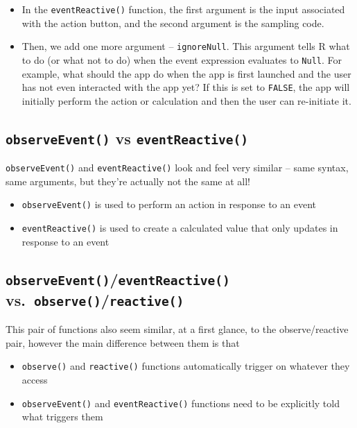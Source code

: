 \documentclass[
  letterpaper,
  DIV=11,
  numbers=noendperiod]{scrreprt}
\providecommand{\tightlist}{%
  \setlength{\itemsep}{0pt}\setlength{\parskip}{0pt}}
\begin{document}
\begin{itemize}
\tightlist
\item
  In the \texttt{eventReactive()} function, the first argument is the
  input associated with the action button, and the second argument is
  the sampling code.
\item
  Then, we add one more argument -- \texttt{ignoreNull}. This argument
  tells R what to do (or what not to do) when the event expression
  evaluates to \texttt{Null}. For example, what should the app do when
  the app is first launched and the user has not even interacted with
  the app yet? If this is set to \texttt{FALSE}, the app will initially
  perform the action or calculation and then the user can re-initiate
  it.
\end{itemize}

\hypertarget{observeevent-vs-eventreactive}{%
\subsection{\texorpdfstring{\texttt{observeEvent()} vs
\texttt{eventReactive()}}{observeEvent() vs eventReactive()}}\label{observeevent-vs-eventreactive}}

\texttt{observeEvent()} and \texttt{eventReactive()} look and feel very
similar -- same syntax, same arguments, but they're actually not the
same at all!

\begin{itemize}
\tightlist
\item
  \texttt{observeEvent()} is used to perform an action in response to an
  event
\item
  \texttt{eventReactive()} is used to create a calculated value that
  only updates in response to an event
\end{itemize}

\hypertarget{observeeventeventreactive-vs.-observereactive}{%
\subsection{\texorpdfstring{\texttt{observeEvent()}/\texttt{eventReactive()}
vs.~\texttt{observe()}/\texttt{reactive()}}{observeEvent()/eventReactive() vs.~observe()/reactive()}}\label{observeeventeventreactive-vs.-observereactive}}

This pair of functions also seem similar, at a first glance, to the
observe/reactive pair, however the main difference between them is that

\begin{itemize}
\tightlist
\item
  \texttt{observe()} and \texttt{reactive()} functions automatically
  trigger on whatever they access
\item
  \texttt{observeEvent()} and \texttt{eventReactive()} functions need to
  be explicitly told what triggers them
\end{itemize}
\end{document}
